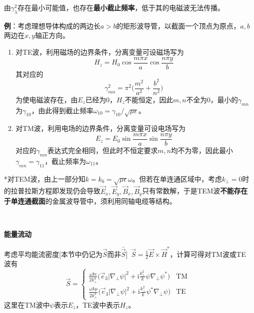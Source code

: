 \documentclass[a4paper,UTF8,fontset=windows]{ctexart}
\newcommand*{\ir}{\mathrm{i}}
\newcommand*{\vb}{\vec{B}}
\newcommand*{\ve}{\vec{E}}
\newcommand*{\vh}{\vec{H}}
\newcommand*{\vs}{\vec{S}}
\newcommand*{\ves}{\vec{e}}
\begin{document}
由$\gamma_\lambda^2$存在最小可能值，也存在\textbf{最小截止频率}，低于其的电磁波无法传播。

\textbf{例}：考虑理想导体构成的两边长$a>b$的矩形波导管，以截面一个顶点为原点，$a,b$两边在$x,y$轴正方向。
\begin{enumerate}
    \item 对TE波，利用磁场的边界条件，分离变量可设磁场写为
    $$H_z=H_0\cos\frac{m\pi x}{a}\cos\frac{n\pi y}{b}$$
    其对应的
    $$\gamma_{mn}^2=\pi^2\bigg(\frac{m^2}{a^2}+\frac{b^2}{n^2}\bigg)$$
    为使电磁波存在，由$E_z$已经为0，$H_z$不能恒定，因此$m,n$不全为0，最小的$\gamma_{mn}$为$\gamma_{10}$，由此得到截止频率$\omega_{10}=\gamma_{10}/\sqrt{\mu\epsilon}$。

    \item 对TM波，利用电场的边界条件，分离变量可设电场写为
    $$E_z=E_0\sin\frac{m\pi x}{a}\sin\frac{n\pi y}{b}$$
    对应的$\gamma_{mn}$表达式完全相同，但此时不恒定要求$m,n$均不为零，因此最小$\gamma_{mn}=\gamma_{11}$，截止频率为$\omega_{11}$。
\end{enumerate}

*对TEM波，由上一部分知$k=k_0=\sqrt{\mu\epsilon}\omega$。但若在单连通区域中，考虑$k_\bot=0$时的拉普拉斯方程即发现仍会导致$\ve_x,\ve_y,\vb_x,\vb_y$只有常数解，于是TEM波\textbf{不能存在于单连通截面}的金属波导管中，须利用同轴电缆等结构。

\

\textbf{能量流动}

考虑平均能流密度[本节中仍记为$\vs$而非$\bar{\vs}$]\ $\vs=\frac{1}{2}\ve\times\vh^*$，计算可得对TM波或TE波有
$$\vs=\begin{cases}\frac{\omega k\epsilon}{2k_\bot^4}\big(\ves_3|\nabla_\bot\psi|^2+\ir\frac{k_\bot^2}{k}\psi\nabla_\bot\psi^*\big)&\text{TM}\\\frac{\omega k\mu}{2k_\bot^4}\big(\ves_3|\nabla_\bot\psi|^2+\ir\frac{k_\bot^2}{k}\psi^*\nabla_\bot\psi\big)&\text{TE}\end{cases}$$
这里在TM波中$\psi$表示$E_z$，TE波中表示$H_z$。
\end{document}
